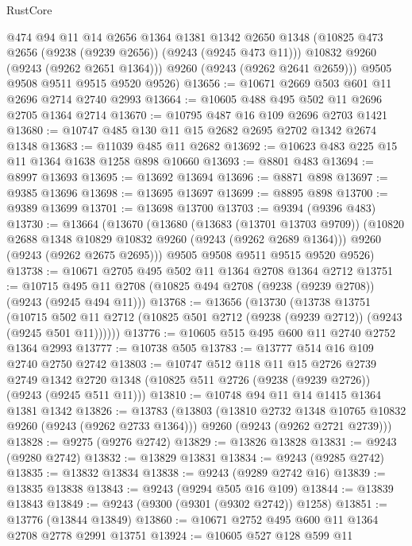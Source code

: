 \begin{lexlean}{RustCore}
\begin{coremodule}
          @474
          @94
          @11
          @14
          @2656
          @1364
          @1381
          @1342
          @2650
          @1348
          (@10825 @473 @2656 (@9238 (@9239 @2656)) (@9243 (@9245 @473 @11)))
          @10832
          @9260
          (@9243 (@9262 @2651 @1364)))
        @9260
        (@9243 (@9262 @2641 @2659)))
      @9505
      @9508
      @9511
      @9515
      @9520
      @9526)
@13656 := @10671 @2669 @503 @601 @11 @2696 @2714 @2740 @2993
@13664 := @10605 @488 @495 @502 @11 @2696 @2705 @1364 @2714
@13670 := @10795 @487 @16 @109 @2696 @2703 @1421
@13680 := @10747 @485 @130 @11 @15 @2682 @2695 @2702 @1342 @2674 @1348
@13683 := @11039 @485 @11 @2682
@13692 := @10623 @483 @225 @15 @11 @1364 @1638 @1258 @898 @10660
@13693 := @8801 @483
@13694 := @8997 @13693
@13695 := @13692 @13694
@13696 := @8871 @898
@13697 := @9385 @13696
@13698 := @13695 @13697
@13699 := @8895 @898
@13700 := @9389 @13699
@13701 := @13698 @13700
@13703 := @9394 (@9396 @483)
@13730 := @13664
    (@13670
      (@13680
        (@13683 (@13701 @13703 @9709))
        (@10820 @2688 @1348 @10829 @10832 @9260 (@9243 (@9262 @2689 @1364)))
        @9260
        (@9243 (@9262 @2675 @2695)))
      @9505
      @9508
      @9511
      @9515
      @9520
      @9526)
@13738 := @10671 @2705 @495 @502 @11 @1364 @2708 @1364 @2712
@13751 := @10715 @495 @11 @2708 (@10825 @494 @2708 (@9238 (@9239 @2708)) (@9243 (@9245 @494 @11)))
@13768 := @13656
    (@13730
      (@13738
        @13751
        (@10715 @502 @11 @2712 (@10825 @501 @2712 (@9238 (@9239 @2712)) (@9243 (@9245 @501 @11))))))
@13776 := @10605 @515 @495 @600 @11 @2740 @2752 @1364 @2993
@13777 := @10738 @505
@13783 := @13777 @514 @16 @109 @2740 @2750 @2742
@13803 := @10747
    @512
    @118
    @11
    @15
    @2726
    @2739
    @2749
    @1342
    @2720
    @1348
    (@10825 @511 @2726 (@9238 (@9239 @2726)) (@9243 (@9245 @511 @11)))
@13810 := @10748 @94 @11 @14 @1415 @1364 @1381 @1342
@13826 := @13783
    (@13803
      (@13810 @2732 @1348 @10765 @10832 @9260 (@9243 (@9262 @2733 @1364)))
      @9260
      (@9243 (@9262 @2721 @2739)))
@13828 := @9275 (@9276 @2742)
@13829 := @13826 @13828
@13831 := @9243 (@9280 @2742)
@13832 := @13829 @13831
@13834 := @9243 (@9285 @2742)
@13835 := @13832 @13834
@13838 := @9243 (@9289 @2742 @16)
@13839 := @13835 @13838
@13843 := @9243 (@9294 @505 @16 @109)
@13844 := @13839 @13843
@13849 := @9243 (@9300 (@9301 (@9302 @2742)) @1258)
@13851 := @13776 (@13844 @13849)
@13860 := @10671 @2752 @495 @600 @11 @1364 @2708 @2778 @2991 @13751
@13924 := @10605
    @527
    @128
    @599
    @11

\end{coremodule}
\end{lexlean}
